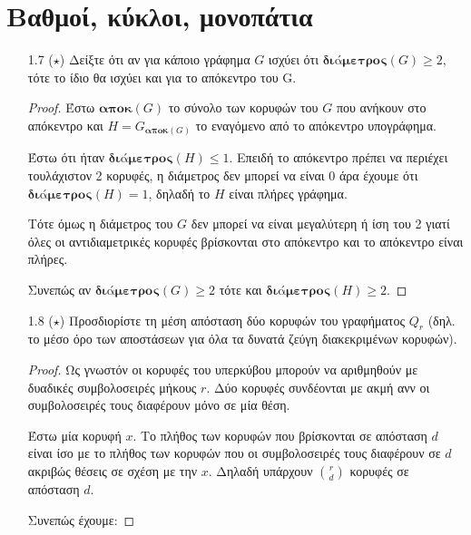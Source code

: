 \documentclass[a4paper, oneside, 11pt]{article}
\theoremstyle{definition}
\begin{document}


\section{Βαθμοί, κύκλοι, μονοπάτια}

\begin{enumerate}
\item[1.7 ($\star$)]
   Δείξτε ότι αν για κάποιο γράφημα $G$ ισχύει ότι
   $\textbf{διάμετρος}(G) \geq 2$, τότε το ίδιο θα ισχύει και για
   το απόκεντρο του G.

   \begin{proof}
   Έστω $\textbf{αποκ}(G)$ το σύνολο των κορυφών του $G$ που ανήκουν στο
   απόκεντρο και $H = G_{\textbf{αποκ}(G)}$ το εναγόμενο από το απόκεντρο
   υπογράφημα.

   Έστω ότι ήταν $\textbf{διάμετρος}(H) \leq 1$. Επειδή το απόκεντρο
   πρέπει να περιέχει τουλάχιστον 2 κορυφές, η διάμετρος δεν μπορεί
   να είναι 0 άρα έχουμε ότι
   $\textbf{διάμετρος}(H) = 1$, δηλαδή το $H$ είναι πλήρες γράφημα.

   Τότε όμως η διάμετρος του $G$ δεν μπορεί να είναι μεγαλύτερη ή ίση
   του 2 γιατί όλες οι αντιδιαμετρικές κορυφές βρίσκονται στο
   απόκεντρο και το απόκεντρο είναι πλήρες.

   Συνεπώς αν $\textbf{διάμετρος}(G) \geq 2$ τότε και
   $\textbf{διάμετρος}(H) \geq 2$.
   \end{proof}

\item[1.8 ($\star$)]
   Προσδιορίστε τη μέση απόσταση δύο κορυφών του γραφήματος $Q_r$ (δηλ.
   το μέσο όρο των αποστάσεων για όλα τα δυνατά ζεύγη διακεκριμένων κορυφών).

   \begin{proof}
      Ως γνωστόν οι κορυφές του υπερκύβου μπορούν να αριθμηθούν
      με δυαδικές συμβολοσειρές μήκους $r$. Δύο κορυφές συνδέονται
      με ακμή ανν οι συμβολοσειρές τους διαφέρουν μόνο σε μία θέση.

      Έστω μία κορυφή $x$. Το πλήθος των κορυφών που βρίσκονται σε
      απόσταση $d$ είναι ίσο με το πλήθος των κορυφών που οι συμβολοσειρές τους
      διαφέρουν σε $d$ ακριβώς θέσεις σε σχέση με την $x$. Δηλαδή υπάρχουν
      ${r \choose d}$ κορυφές σε απόσταση $d$.

      Συνεπώς έχουμε:


\end{proof}
\end{enumerate}
\end{document}
